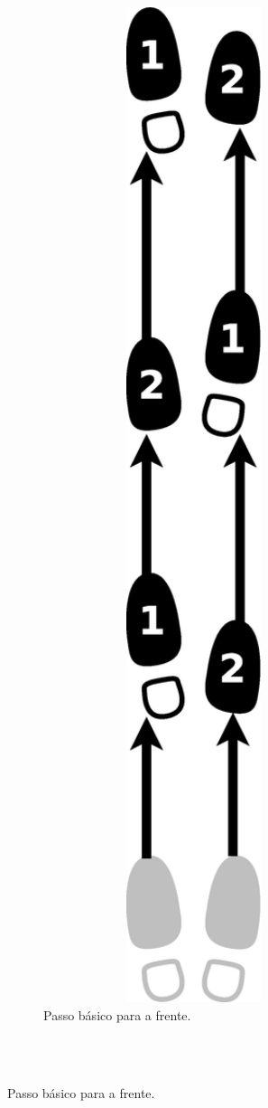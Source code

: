 \begin{figure}[h]
    \centering
    \begin{subfigure}[b]{0.7\textwidth}
        \centering
        \includegraphics[angle=270,width=0.97\textwidth]{chapters/cap-historia-sambagafieira/samba-cancao-basico-frente.eps}
        \caption{Passo básico para a frente.}
        \label{fig:samba-cancao-basico-frente}
    \end{subfigure}
    ~\\~\\ %
    

\end{figure}
